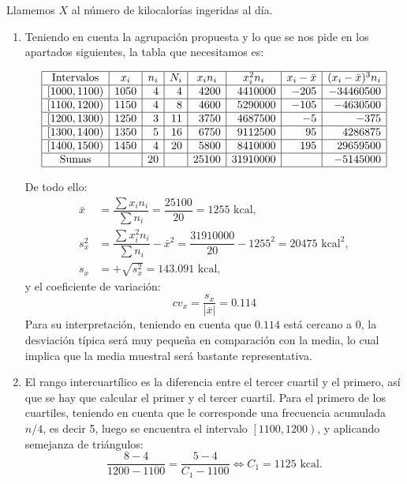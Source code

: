 {Llamemos $X$ al número de kilocalorías ingeridas al día.
\begin{enumerate}
\item Teniendo en cuenta la agrupación propuesta y lo que se nos pide en los apartados siguientes, la tabla que necesitamos es:

\[
\begin{array}{|c|r|r|r|r|r|r|r|} \hline
\textrm{Intervalos} & \multicolumn{1}{c|}{x_{i}} & \multicolumn{1}{c|}{n_{i}} &
\multicolumn{1}{c|}{N_{i}} & \multicolumn{1}{c|}{x_{i}n_{i}} &
\multicolumn{1}{c|}{x_{i}^{2}n_{i}} & \multicolumn{1}{c|}{x_{i}-\bar x} &
\multicolumn{1}{c|}{(x_{i}- \bar x)^3n_{i}}
\\ \hline
\left[ 1000,1100\right)  & 1050 & 4 & 4 & 4200 &  4410000 & -205 & -34460500
\\ \hline
\left[ 1100,1200\right)  & 1150 & 4 & 8 & 4600 & 5290000 & -105 & -4630500
\\ \hline
\left[ 1200,1300\right)  & 1250 & 3 & 11 & 3750 & 4687500 & -5 & -375
\\ \hline
\left[ 1300,1400\right)  & 1350 & 5 & 16 & 6750 &  9112500 & 95 & 4286875
\\ \hline
\left[ 1400,1500\right)  & 1450 & 4 & 20 & 5800 &  8410000 & 195 & 29659500
\\ \hline
\textrm{Sumas}&  & 20 &  & 25100 &  31910000 & & -5145000
\\ \hline
\end{array}
\]

De todo ello:
\begin{align*}
\bar x& =\dfrac{\sum x_{i}n_{i}}{\sum n_{i}}=\dfrac{25100}{20}=1255\text{ kcal},\\
s_{x}^{2}& =\dfrac{\sum x_{i}^{2}n_{i}}{\sum n_{i}}-\bar x^{2}=\dfrac{31910000}{20}-1255^{2}=20475\text{ kcal}^{2},\\
s_{x}& =+\sqrt{s_{x}^{2}}=143.091\text{ kcal},
\end{align*}
y el coeficiente de variación:
\[
cv_x=\dfrac{s_{x}}{\left| \overline{x}\right| }=0.114
\]
Para su interpretación, teniendo en cuenta que $0.114$ está cercano a 0, la desviación típica será muy pequeña en comparación con la media,
lo cual implica que la media muestral será bastante representativa.

\item El rango intercuartílico es la diferencia entre el tercer cuartil y el primero, así que se hay que calcular el primer y
el tercer cuartil. Para el primero de los cuartiles, teniendo en cuenta que le corresponde una frecuencia acumulada $n/4$, es decir 5, luego
se encuentra el intervalo $\left[ 1100,1200\right)$, y aplicando semejanza de triángulos:
\[
\dfrac{8-4}{1200-1100}=\dfrac{5-4}{C_{1}-1100} \Leftrightarrow C_{1}=1125\text{ kcal}.
\]


\end{enumerate}}
